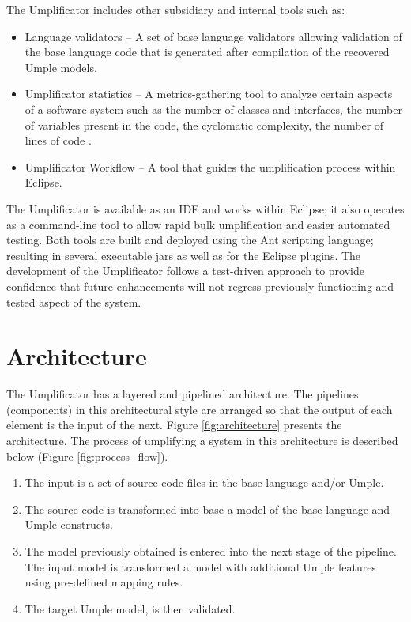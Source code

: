 The Umplificator includes other subsidiary and internal tools such as:
\begin{itemize}
\item Language validators – A set of base language validators allowing validation of the base language code that is generated after compilation of the recovered Umple models.
\item Umplificator statistics –  A metrics-gathering tool to analyze certain aspects of a software system such as the number of classes and interfaces, the  number of variables present in the code, the cyclomatic complexity, the number of lines of code \cite{MetricsBuse}.  
\item Umplificator Workflow – A tool that guides the umplification process within Eclipse.
\end{itemize}
The Umplificator is available as an IDE and works within Eclipse; it also operates as a command-line tool to allow rapid bulk umplification and easier automated testing. Both tools are built and deployed using the Ant scripting language; resulting in several executable jars as well as for the Eclipse plugins. 
The development of the Umplificator follows a test-driven approach to provide confidence that future enhancements will not regress previously functioning and tested aspect of the system. 

\section{Architecture}
The Umplificator has a layered and pipelined architecture. The pipelines (components) in this architectural style are arranged so that the output of each element is the input of the next.  Figure \ref{fig:architecture} presents the architecture.
The process of umplifying a system in this architecture is described below (Figure   \ref{fig:process_flow}). 
\begin{enumerate}
\item The input is a set of source code files in the base language and/or Umple.
\item The source code is transformed into base-a model of the base language and Umple constructs.
\item The model previously obtained is entered into the next stage of the pipeline. The input model is transformed a model with additional Umple features using pre-defined mapping rules. 
\item The target Umple model, is then validated. 
\end{enumerate}

